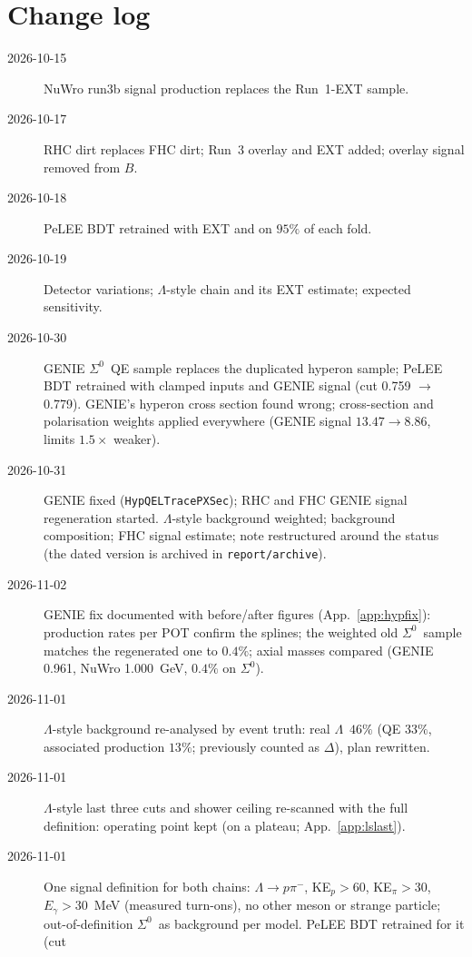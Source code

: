 \documentclass[11pt,a4paper]{article}
\newcommand{\Szero}{\ensuremath{\Sigma^{0}}}
\newcommand{\Lam}{\ensuremath{\Lambda}}
\begin{document}
\section{Change log}
\label{app:log}
\begin{description}
  \item[2026-10-15] NuWro run3b signal production replaces the Run~1-EXT sample.
  \item[2026-10-17] RHC dirt replaces FHC dirt; Run~3 overlay and EXT added; overlay
        signal removed from $B$.
  \item[2026-10-18] PeLEE BDT retrained with EXT and on $95\%$ of each fold.
  \item[2026-10-19] Detector variations; \Lam-style chain and its EXT estimate; expected
        sensitivity.
  \item[2026-10-30] GENIE \Szero\ QE sample replaces the duplicated hyperon sample; PeLEE
        BDT retrained with clamped inputs and GENIE signal (cut 0.759 $\to$ 0.779).
        GENIE's hyperon cross section found wrong; cross-section and polarisation weights
        applied everywhere (GENIE signal $13.47\to8.86$, limits $1.5\times$ weaker).
  \item[2026-10-31] GENIE fixed (\texttt{HypQELTracePXSec}); RHC and FHC GENIE signal
        regeneration started. \Lam-style background weighted; background composition; FHC
        signal estimate; note restructured around the status (the dated
        version is archived in \texttt{report/archive}).
  \item[2026-11-02] GENIE fix documented with before/after figures (App.~\ref{app:hypfix}):
        production rates per POT confirm the splines; the weighted old \Szero\ sample matches the
        regenerated one to $0.4\%$; axial masses compared (GENIE 0.961, NuWro 1.000~GeV, $0.4\%$
        on \Szero).
  \item[2026-11-01] \Lam-style background re-analysed by event truth: real \Lam\ $46\%$ (QE
        $33\%$, associated production $13\%$; previously counted as $\Delta$), plan rewritten.
  \item[2026-11-01] \Lam-style last three cuts and shower ceiling re-scanned with the full
        definition: operating point kept (on a plateau; App.~\ref{app:lslast}).
  \item[2026-11-01] One signal definition for both chains: $\Lam\to p\pi^-$, KE$_p>60$,
        KE$_\pi>30$, $E_\gamma>30$~MeV (measured turn-ons), no other meson or strange particle;
        out-of-definition \Szero\ as background per model. PeLEE BDT retrained for it (cut

\end{description}
\end{document}

